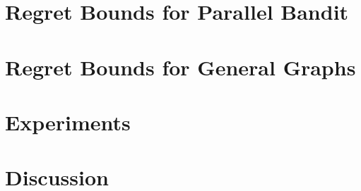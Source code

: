 \documentclass{article}
\theoremstyle{plain}
\theoremstyle{definition}
\begin{document}
\section{Regret Bounds for Parallel Bandit}
\label{sec:simple-regret}




\section{Regret Bounds for General Graphs}
\label{sec:simple-regret-general}

 


\section{Experiments}



\section{Discussion}







\onecolumn


\end{document}
